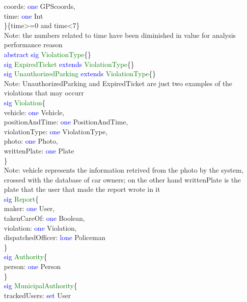 coords: \textcolor{blue}{one} GPScoords,\\
time: \textcolor{blue}{one} Int\\ 
\}\{time>=0 and time<7\} \\
Note: the numbers related to time have been diminished in value for analysis performance reason\\
\textcolor{blue}{abstract sig}
\textcolor{green}{ViolationType}\{\} \\
\textcolor{blue}{sig}
\textcolor{green}{ExpiredTicket}
\textcolor{blue}{extends}
\textcolor{green}{ViolationType}\{\} \\
\textcolor{blue}{sig}
\textcolor{green}{UnauthorizedParking}
\textcolor{blue}{extends}
\textcolor{green}{ViolationType}\{\} \\
Note: UnauthorizedParking and ExpiredTicket are just two examples of the violations that may occurr\\
\textcolor{blue}{sig}
\textcolor{green}{Violation}\{ \\
vehicle: \textcolor{blue}{one} Vehicle,\\ 
positionAndTime: \textcolor{blue}{one} PositionAndTime,\\
violationType: \textcolor{blue}{one} ViolationType,\\
photo: \textcolor{blue}{one} Photo,\\
writtenPlate: \textcolor{blue}{one} Plate\\
\}\ \\
Note: vehicle represents the information retrived from the photo by the system, crossed with the database of car owners; on the other hand writtenPlate is the plate that the user that made the report wrote in it\\
\textcolor{blue}{sig}
\textcolor{green}{Report}\{\\
maker: \textcolor{blue}{one} User,\\
takenCareOf: \textcolor{blue}{one} Boolean,\\
violation: \textcolor{blue}{one} Violation,\\
dispatchedOfficer: \textcolor{blue}{lone} Policeman\\
\}\\
\textcolor{blue}{sig}
\textcolor{green}{Authority}\{\\
person: \textcolor{blue}{one} Person\\
\} \\
\textcolor{blue}{sig}
\textcolor{green}{MunicipalAuthority}\{\\
trackedUsers: \textcolor{blue}{set} User\\
